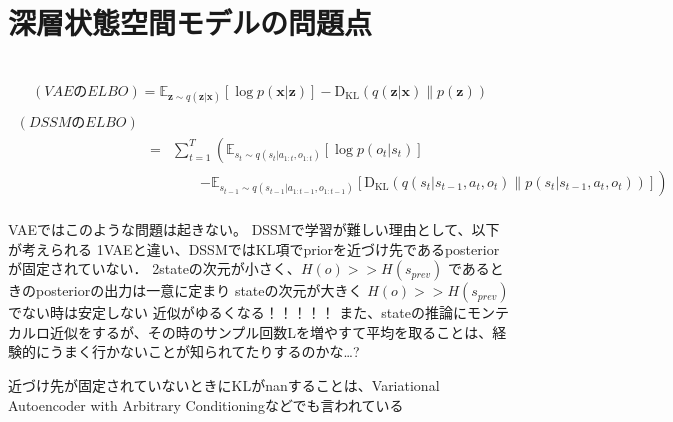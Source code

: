 \section{深層状態空間モデルの問題点}
\begin{eqnarray}
  \end{eqnarray}
  
\begin{eqnarray}
    (VAEのELBO) \nonumber = \mathbb{E}_{\bm{z} \sim q(\bm{z}|\bm{x})} [\log p(\bm{x}|\bm{z})] - \mathrm{D_{KL}}(q(\bm{z}|\bm{x}) \| p(\bm{z})) \label{eq:vae_elbo2} \\
\end{eqnarray}
\begin{eqnarray}
    \ (DSSMのELBO) \nonumber \\
    &=& \sum_{t=1}^T \left( \mathbb{E}_{s_t \sim q(s_t|a_{1:t}, o_{1:t})} [\log p(o_t|s_t)] \right. \nonumber \\
    && \hspace{2em} \left. - \mathbb{E}_{s_{t-1} \sim q(s_{t-1}|a_{1:t-1}, o_{1:t-1})} [\mathrm{D_{KL}}(q(s_t|s_{t-1}, a_t, o_t) \| p(s_t|s_{t-1}, a_t, o_t))] \right)  \nonumber \\
    \label{eq:dssm_elbo2}
  \end{eqnarray}

VAEではこのような問題は起きない。
DSSMで学習が難しい理由として、以下が考えられる
1VAEと違い、DSSMではKL項でpriorを近づけ先であるposteriorが固定されていない．
2stateの次元が小さく、$H(o) >> H(s_{prev})$ であるときのposteriorの出力は一意に定まり
stateの次元が大きく $H(o) >> H(s_{prev})$でない時は安定しない
近似がゆるくなる！！！！！
また、stateの推論にモンテカルロ近似をするが、その時のサンプル回数Lを増やすて平均を取ることは、経験的にうまく行かないことが知られてたりするのかな…?

近づけ先が固定されていないときにKLがnanすることは、Variational Autoencoder with Arbitrary Conditioningなどでも言われている
